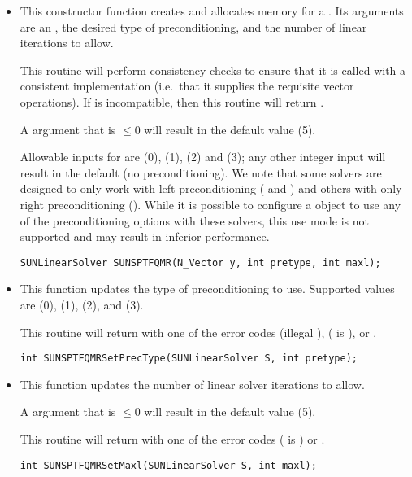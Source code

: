 \begin{itemize}


\item {}

  This constructor function creates and allocates memory for a {\sptfqmr}
  .  Its arguments are an {\nvector}, the desired
  type of preconditioning, and the number of linear iterations to
  allow.

  This routine will perform consistency checks to ensure that it is
  called with a consistent {\nvector} implementation (i.e.~that it
  supplies the requisite vector operations).  If  is
  incompatible, then this routine will return .

  A  argument that is $\le0$ will result in the default
  value (5).

  Allowable inputs for  are  (0),
   (1),  (2) and  (3);
  any other integer input will result in the default (no
  preconditioning).
  We note that some {\sundials} solvers are designed to only work
  with left preconditioning ({\ida} and {\idas}) and others with only
  right preconditioning ({\kinsol}). While it is possible to configure
  a {\sunlinsolsptfqmr} object to use any of the preconditioning options
  with these solvers, this use mode is not supported and may result in
  inferior performance.

  \verb|SUNLinearSolver SUNSPTFQMR(N_Vector y, int pretype, int maxl);|


\item {}

  This function updates the type of preconditioning to use.  Supported
  values are  (0),  (1),
   (2), and  (3).  

  This routine will return with one of the error codes
   (illegal ), 
  ( is ), or .
  
  \verb|int SUNSPTFQMRSetPrecType(SUNLinearSolver S, int pretype);|


\item {}

  This function updates the number of linear solver iterations to allow.  

  A  argument that is $\le0$ will result in the default
  value (5).

  This routine will return with one of the error codes
   ( is ) or .
  
  \verb|int SUNSPTFQMRSetMaxl(SUNLinearSolver S, int maxl);|

\end{itemize}
